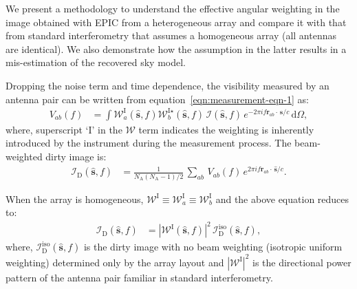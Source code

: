 \documentclass[a4paper,fleqn,usenatbib]{mnras}
\newcommand{\Nant}{N_\textrm{A}}
\newcommand{\dif}{\mathrm{d}}
\begin{document}
We present a methodology to understand the effective angular weighting in the image obtained with EPIC from a heterogeneous array and compare it with that from standard interferometry that assumes a homogeneous array (all antennas are identical). We also demonstrate how the assumption in the latter results in a mis-estimation of the recovered sky model.

Dropping the noise term and time dependence, the visibility measured by an antenna pair can be written from equation~\ref{eqn:measurement-eqn-1} as:
\begin{align}\label{eqn:measurement-eqn-2}
  V_{ab}(f) &= \int \mathcal{W}^\textrm{I}_a(\hat{\mathbf{s}},f)\mathcal{W}^{\textrm{I}\star}_b(\hat{\mathbf{s}},f)\,\mathcal{I}(\hat{\mathbf{s}},f)\,e^{-2\pi i f\mathbf{r}_{ab}\!\cdot\,\hat{\mathbf{s}}/c}\,\dif\Omega,
\end{align}
where, superscript `$\textrm{I}$' in the $\mathcal{W}$ term indicates the weighting is inherently introduced by the instrument during the measurement process. The beam-weighted dirty image is:
\begin{align}
  \mathcal{I}_\textrm{D}(\hat{\mathbf{s}},f) &= \frac{1}{\Nant(\Nant-1)/2}\,\sum_{ab}\, V_{ab}(f)\,e^{2\pi i f\mathbf{r}_{ab}\!\cdot\,\hat{\mathbf{s}}/c}.
\end{align}

When the array is homogeneous, $\mathcal{W}^\textrm{I} \equiv \mathcal{W}^\textrm{I}_a \equiv \mathcal{W}^\textrm{I}_b$ and the above equation reduces to:
\begin{align}\label{eqn:dirty-image-homogeneous}
  \mathcal{I}_\textrm{D}(\hat{\mathbf{s}},f) &= |\mathcal{W}^\textrm{I}(\hat{\mathbf{s}},f)|^2\,\mathcal{I}_\textrm{D}^\textrm{iso}(\hat{\mathbf{s}},f),
\end{align}
where, $\mathcal{I}_\textrm{D}^\textrm{iso}(\hat{\mathbf{s}},f)$ is the dirty image with no beam weighting (isotropic uniform weighting) determined only by the array layout and $|\mathcal{W}^\textrm{I}|^2$ is the directional power pattern of the antenna pair familiar in standard interferometry.
\end{document}
